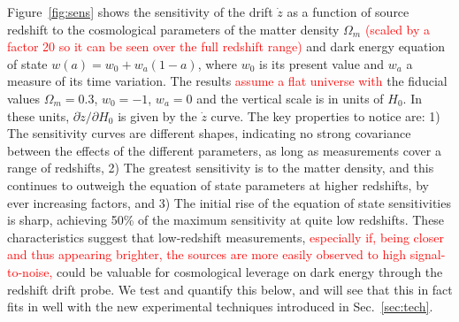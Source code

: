 \documentclass[preprint2, 10pt]{aastex}
\newcommand{\om}{\Omega_m}
\begin{document}
Figure~\ref{fig:sens} shows the sensitivity of the drift $\dot z$ as a 
function of source redshift to the cosmological parameters of the matter 
density $\om$
\textcolor{red}{
(scaled by a factor 20 so it can be seen over the full redshift range)
}
and dark energy equation of state $w(a)=w_0+w_a(1-a)$, where 
$w_0$ is its present value and $w_a$ a measure of its time variation.
The results
\textcolor{red}{assume
a flat universe with}
the fiducial values $\om=0.3$, $w_0=-1$, $w_a=0$ and the 
vertical scale is in units of $H_0$.  In these units, 
$\partial\dot z/\partial H_0$ is 
given by the $\dot z$ curve. The key properties to notice are: 
1) The sensitivity curves are different 
shapes, indicating no strong covariance between the effects of the different 
parameters, as long as measurements cover a range of redshifts, 
2) The greatest sensitivity is to the matter density, and this 
continues to outweigh the equation of state parameters at higher redshifts, 
by ever increasing factors, and 3) The initial rise of the equation of 
state sensitivities is sharp, achieving 50\% of the maximum sensitivity 
at quite low redshifts. These characteristics suggest that low-redshift 
measurements, 
\textcolor{red}
{especially if, being closer and thus appearing brighter, the sources are more
easily observed to high signal-to-noise,}
could be valuable for cosmological leverage on dark energy 
through the redshift drift probe. We test and quantify this below, and will see that this in fact fits in 
well with the new experimental techniques introduced in Sec.~\ref{sec:tech}. 
\end{document}
